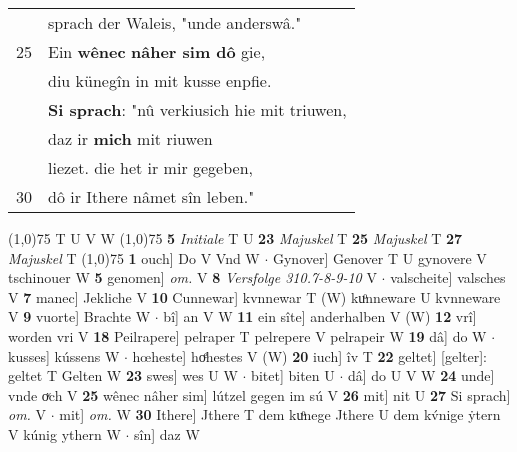 \documentclass[8pt,a4paper,notitlepage]{article}
\begin{document}
\begin{table}[ht]
\begin{minipage}[t]{0.5\linewidth}
\begin{tabular}{rl}
 & sprach der Waleis, "unde anderswâ."\\ 
25 & Ein \textbf{wênec} \textbf{nâher sim dô} gie,\\ 
 & diu künegîn in mit kusse enpfie.\\ 
 & \textbf{Si sprach}: "nû verkiusich hie mit triuwen,\\ 
 & daz ir \textbf{mich} mit riuwen\\ 
 & liezet. die het ir mir gegeben,\\ 
30 & dô ir Ithere nâmet sîn leben."\\ 
\end{tabular}
\scriptsize
\line(1,0){75} \newline
T U V W \newline
\line(1,0){75} \newline
\textbf{5} \textit{Initiale} T U  \textbf{23} \textit{Majuskel} T  \textbf{25} \textit{Majuskel} T  \textbf{27} \textit{Majuskel} T  \newline
\line(1,0){75} \newline
\textbf{1} ouch] Do V Vnd W  $\cdot$ Gynover] Genover T U gynovere V tschinouer W \textbf{5} genomen] \textit{om.} V \textbf{8} \textit{Versfolge 310.7-8-9-10} V   $\cdot$ valscheite] valsches V \textbf{7} manec] Jekliche V \textbf{10} Cunnewar] kvnnewar T (W) kuͦnneware U kvnneware V \textbf{9} vuorte] Brachte W  $\cdot$ bî] an V W \textbf{11} ein sîte] anderhalben V (W) \textbf{12} vrî] worden vri V \textbf{18} Peilrapere] pelraper T pelrepere V pelrapeir W \textbf{19} dâ] do W  $\cdot$ kusses] kússens W  $\cdot$ hœheste] hoͤhestes V (W) \textbf{20} iuch] îv T \textbf{22} geltet] [gelter]: geltet T Gelten W \textbf{23} swes] wes U W  $\cdot$ bitet] biten U  $\cdot$ dâ] do U V W \textbf{24} unde] vnde oͮch V \textbf{25} wênec nâher sim] lútzel gegen im sú V \textbf{26} mit] nit U \textbf{27} Si sprach] \textit{om.} V  $\cdot$ mit] \textit{om.} W \textbf{30} Ithere] Jthere T dem kuͦnege Jthere U dem kv́nige ẏtern V kúnig ythern W  $\cdot$ sîn] daz W \newline
\end{minipage}
\end{table}
\end{document}

